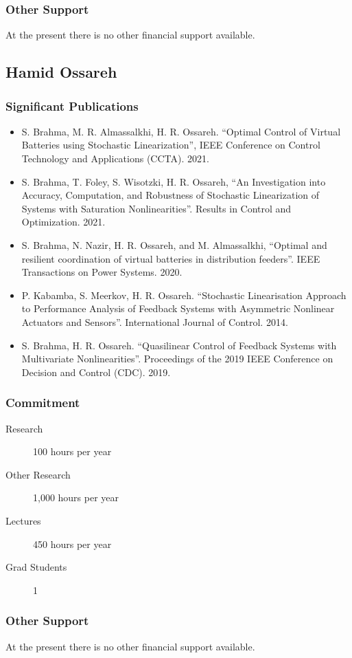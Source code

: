 \subsubsection{Other Support}
At the present there is no other financial support available.

\subsection{Hamid Ossareh}
%
\subsubsection{Significant Publications}

\begin{itemize}
\item S. Brahma, M. R. Almassalkhi, H. R. Ossareh. ``Optimal Control
  of Virtual Batteries using Stochastic Linearization'', IEEE
  Conference on Control Technology and Applications (CCTA). 2021.
\item S. Brahma, T. Foley, S. Wisotzki, H. R. Ossareh, ``An
  Investigation into Accuracy, Computation, and Robustness of
  Stochastic Linearization of Systems with Saturation
  Nonlinearities''. Results in Control and Optimization. 2021.
\item S. Brahma, N. Nazir, H. R. Ossareh, and M. Almassalkhi,
  ``Optimal and resilient coordination of virtual batteries in
  distribution feeders''. IEEE Transactions on Power Systems. 2020.
\item P. Kabamba, S. Meerkov, H. R. Ossareh. ``Stochastic
  Linearisation Approach to Performance Analysis of Feedback Systems
  with Asymmetric Nonlinear Actuators and Sensors''. International
  Journal of Control. 2014.
\item S. Brahma, H. R. Ossareh. ``Quasilinear Control of Feedback
  Systems with Multivariate Nonlinearities''. Proceedings of the 2019
  IEEE Conference on Decision and Control (CDC). 2019.
\end{itemize}

\subsubsection{Commitment}
\begin{description}
\item[Research] 100 hours per year
\item[Other Research] 1,000 hours per year
\item[Lectures]  450 hours per year
\item[Grad Students] 1
\end{description}

\subsubsection{Other Support}
At the present there is no other financial support available.

